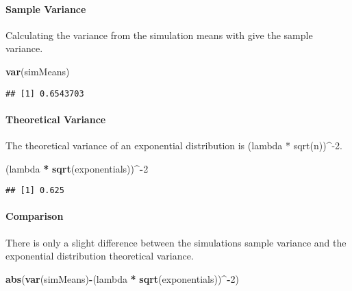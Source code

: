 \documentclass[]{article}
\newenvironment{Shaded}{\begin{snugshade}}{\end{snugshade}}
\newcommand{\KeywordTok}[1]{\textcolor[rgb]{0.13,0.29,0.53}{\textbf{#1}}}
\newcommand{\DecValTok}[1]{\textcolor[rgb]{0.00,0.00,0.81}{#1}}
\newcommand{\StringTok}[1]{\textcolor[rgb]{0.31,0.60,0.02}{#1}}
\newcommand{\OperatorTok}[1]{\textcolor[rgb]{0.81,0.36,0.00}{\textbf{#1}}}
\newcommand{\NormalTok}[1]{#1}
\let\oldparagraph\paragraph
\renewcommand{\paragraph}[1]{\oldparagraph{#1}\mbox{}}
\begin{document}
\paragraph{Sample Variance}\label{sample-variance}

Calculating the variance from the simulation means with give the sample
variance.

\begin{Shaded}
\begin{Highlighting}[]
\KeywordTok{var}\NormalTok{(simMeans)}
\end{Highlighting}
\end{Shaded}

\begin{verbatim}
## [1] 0.6543703
\end{verbatim}

\paragraph{Theoretical Variance}\label{theoretical-variance}

The theoretical variance of an exponential distribution is (lambda *
sqrt(n))\^{}-2.

\begin{Shaded}
\begin{Highlighting}[]
\NormalTok{(lambda }\OperatorTok{*}\StringTok{ }\KeywordTok{sqrt}\NormalTok{(exponentials))}\OperatorTok{^-}\DecValTok{2}
\end{Highlighting}
\end{Shaded}

\begin{verbatim}
## [1] 0.625
\end{verbatim}

\paragraph{Comparison}\label{comparison-1}

There is only a slight difference between the simulations sample
variance and the exponential distribution theoretical variance.

\begin{Shaded}
\begin{Highlighting}[]
\KeywordTok{abs}\NormalTok{(}\KeywordTok{var}\NormalTok{(simMeans)}\OperatorTok{-}\NormalTok{(lambda }\OperatorTok{*}\StringTok{ }\KeywordTok{sqrt}\NormalTok{(exponentials))}\OperatorTok{^-}\DecValTok{2}\NormalTok{)}
\end{Highlighting}
\end{Shaded}
\end{document}
